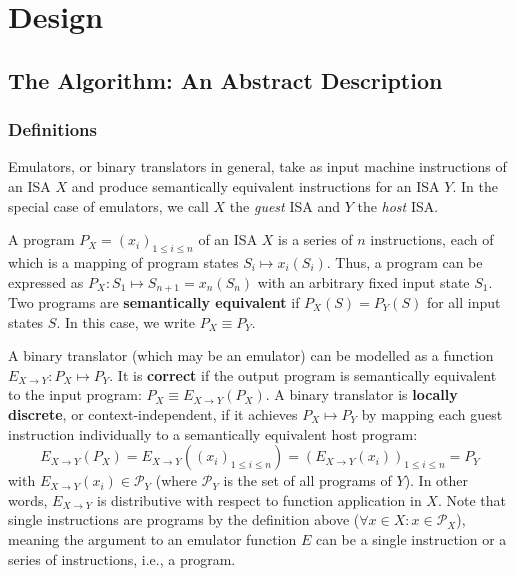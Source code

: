 \chapter{Design}\label{chapter:design}

\section{The Algorithm: An Abstract Description}\label{sec:abstract_algo}

\subsection{Definitions}\label{sec:definitions}

Emulators, or binary translators in general, take as input machine instructions of an \ac{ISA} $X$ and produce
semantically equivalent instructions for an \ac{ISA} $Y$. In the special case of emulators, we call $X$ the
\textit{guest} \ac{ISA} and $Y$ the \textit{host} \ac{ISA}.

A program $P_X = (x_i)_{1 \leq i \leq n}$ of an \ac{ISA} $X$ is a series of $n$ instructions, each of which is a mapping
of program states $S_i \mapsto x_i(S_i)$. Thus, a program can be expressed as
    $P_X : S_1 \mapsto S_{n+1} = x_n(S_n)$
with an arbitrary fixed input state $S_1$. Two programs are \textbf{semantically equivalent} if $P_X(S) = P_Y(S)$ for
all input states $S$. In this case, we write $P_X \equiv P_Y$.

A binary translator (which may be an emulator) can be modelled as a function $E_{X \rightarrow Y}: P_X \mapsto P_Y$. It
is \textbf{correct} if the output program is semantically equivalent to the input program:
    $P_X \equiv E_{X \rightarrow Y}(P_X)$.
A binary translator is \textbf{locally discrete}, or context-independent, if it achieves $P_X \mapsto P_Y$ by mapping
each guest instruction individually to a semantically equivalent host program:
\begin{equation}\label{eq:locally_discrete}
    E_{X\rightarrow Y}(P_X) = E_{X \rightarrow Y}((x_i)_{1 \leq i \leq n}) = (E_{X \rightarrow Y}(x_i))_{1 \leq i \leq n} = P_Y
\end{equation}
with $E_{X\rightarrow Y}(x_i) \in \mathcal{P}_Y$ (where $\mathcal{P}_Y$ is the set of all programs of $Y$). In other
words, $E_{X\rightarrow Y}$ is distributive with respect to function application in $X$. Note that single instructions
are programs by the definition above ($\forall x \in X: x \in \mathcal{P}_X $), meaning the argument to an emulator
function $E$ can be a single instruction or a series of instructions, i.e., a program.

